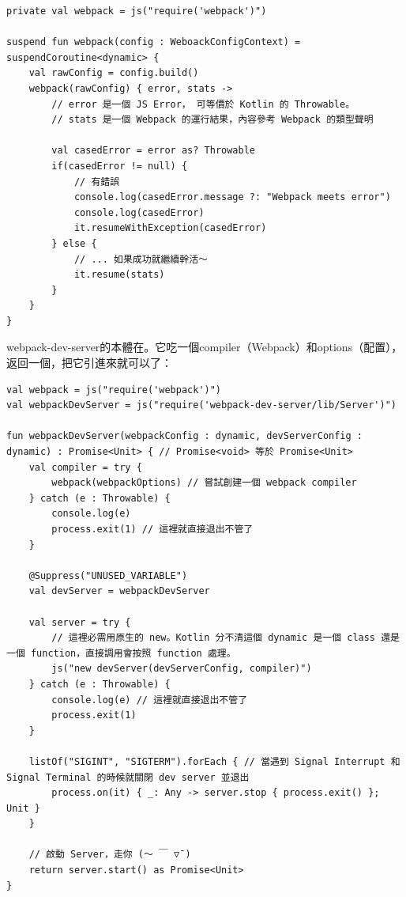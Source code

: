 \begin{lstlisting}
private val webpack = js("require('webpack')")

suspend fun webpack(config : WeboackConfigContext) = suspendCoroutine<dynamic> {
    val rawConfig = config.build()
    webpack(rawConfig) { error, stats -> 
        // error 是一個 JS Error， 可等價於 Kotlin 的 Throwable。 
        // stats 是一個 Webpack 的運行結果，內容參考 Webpack 的類型聲明

        val casedError = error as? Throwable
        if(casedError != null) {
            // 有錯誤
            console.log(casedError.message ?: "Webpack meets error")
            console.log(casedError)
            it.resumeWithException(casedError)
        } else {
            // ... 如果成功就繼續幹活～
            it.resume(stats)
        }
    }
}
\end{lstlisting}

webpack-dev-server的本體在。它吃一個compiler（Webpack）和options（配置），返回一個，把它引進來就可以了：

\begin{lstlisting}
val webpack = js("require('webpack')")
val webpackDevServer = js("require('webpack-dev-server/lib/Server')")

fun webpackDevServer(webpackConfig : dynamic, devServerConfig : dynamic) : Promise<Unit> { // Promise<void> 等於 Promise<Unit>
    val compiler = try {
        webpack(webpackOptions) // 嘗試創建一個 webpack compiler
    } catch (e : Throwable) {
        console.log(e)
        process.exit(1) // 這裡就直接退出不管了
    }

    @Suppress("UNUSED_VARIABLE") 
    val devServer = webpackDevServer

    val server = try {
        // 這裡必需用原生的 new。Kotlin 分不清這個 dynamic 是一個 class 還是一個 function，直接調用會按照 function 處理。
        js("new devServer(devServerConfig, compiler)")
    } catch (e : Throwable) {
        console.log(e) // 這裡就直接退出不管了
        process.exit(1)
    }

    listOf("SIGINT", "SIGTERM").forEach { // 當遇到 Signal Interrupt 和 Signal Terminal 的時候就關閉 dev server 並退出
        process.on(it) { _: Any -> server.stop { process.exit() }; Unit }
    }

    // 啟動 Server，走你 (～ ￣ ▽ˉ) 
    return server.start() as Promise<Unit>
}
\end{lstlisting}






